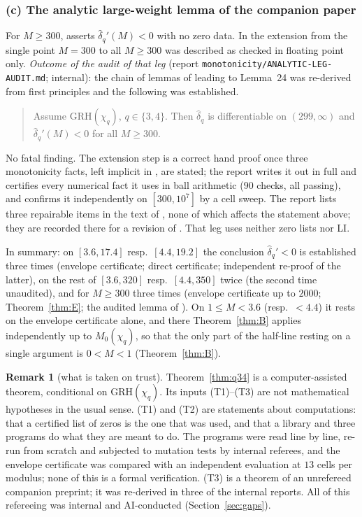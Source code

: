 \documentclass[11pt]{amsart}
\theoremstyle{definition}
\newtheorem{remark}[theorem]{Remark}
\numberwithin{equation}{section}
\newcommand{\hd}{\widehat\delta}
\begin{document}
\subsubsection*{(c) The analytic large-weight lemma of the companion paper}
For $M\ge300$, \cite[Lemma~24]{WR} asserts $\hd_q'(M)<0$ with no zero
data. In \cite{WR} the extension from the single point $M=300$ to all
$M\ge300$ was described as checked in floating point only.
\emph{Outcome of the audit of that leg} (report
\texttt{monotonicity/ANALYTIC-LEG-AUDIT.md}; internal): the chain of
lemmas of \cite[\S6]{WR} leading to Lemma~24 was re-derived from first
principles and the following was established.
\begin{quote}
Assume GRH$(\chi_q)$, $q\in\{3,4\}$. Then $\hd_q$ is differentiable on
$(299,\infty)$ and $\hd_q'(M)<0$ for all $M\ge300$.
\end{quote}
No fatal finding. The extension step is a correct hand proof once
three monotonicity facts, left implicit in \cite{WR}, are stated; the
report writes it out in full and certifies every numerical fact it
uses in ball arithmetic ($90$ checks, all passing), and confirms it
independently on $[300,10^7]$ by a cell sweep. The report lists three
repairable items in the text of \cite{WR}, none of which affects the
statement above; they are recorded there for a revision of \cite{WR}.
That leg uses neither zero lists nor LI.

\medskip
In summary: on $[3.6,17.4]$ resp.\ $[4.4,19.2]$ the conclusion
$\hd_q'<0$ is established three times (envelope certificate; direct
certificate; independent re-proof of the latter), on the rest of
$[3.6,320]$ resp.\ $[4.4,350]$ twice (the second time unaudited), and
for $M\ge300$ three times (envelope certificate up to $2000$;
Theorem~\ref{thm:E}; the audited lemma of \cite{WR}). On
$1\le M<3.6$ (resp.\ $<4.4$) it rests on the envelope certificate
alone, and there Theorem~\ref{thm:B} applies independently up to
$M_0(\chi_q)$, so that the only part of the half-line resting on a
single argument is $0<M<1$ (Theorem~\ref{thm:B}).

\begin{remark}[what is taken on trust]\label{rem:mainstatus}
Theorem~\ref{thm:q34} is a computer-assisted theorem, conditional on
GRH$(\chi_q)$. Its inputs (T1)--(T3) are not mathematical hypotheses
in the usual sense. (T1) and (T2) are statements about computations:
that a certified list of zeros is the one that was used, and that a
library and three programs do what they are meant to do. The programs
were read line by line, re-run from scratch and subjected to mutation
tests by internal referees, and the envelope certificate was compared
with an independent evaluation at $13$ cells per modulus; none of
this is a formal verification. (T3) is a theorem of an unrefereed
companion preprint; it was re-derived in three of the internal
reports. All of
this refereeing was internal and AI-conducted
(Section~\ref{sec:gaps}).
\end{remark}
\end{document}
